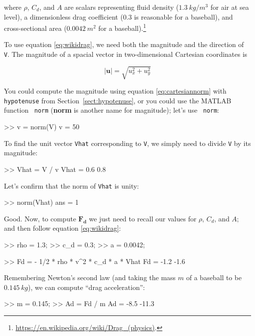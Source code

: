 \documentclass[
]{book}
\numberwithin{Answer}{chapter}
\numberwithin{Exercise}{chapter}
\renewcommand{\vec}[1]{\bm{\mathbf{#1}}}
\newcommand{\norm}[1]{\lvert #1 \rvert}
\begin{document}
where $\rho$, $C_d$, and $A$ are scalars representing fluid density
($1.3 ~ kg/m^3$ for air at sea level), a dimensionless drag coefficient
($0.3$ is reasonable for a baseball), and cross-sectional area ($0.0042
~ m^2$ for a baseball).\footnote{
    \url{https://en.wikipedia.org/wiki/Drag_(physics)}.}

To use equation \eqref{eq:wikidrag}, we need both the magnitude and the
direction of {\tt V}. The magnitude of a spacial vector \vec{u} in
two-dimensional Cartesian coordinates is

\begin{equation}\label{eq:cartesiannorm}
    \norm{\vec{u}} = \sqrt{u_x^2 + u_y^2}
\end{equation}

You could compute the magnitude using equation
\eqref{eq:cartesiannorm} with {\tt hypotenuse} from
Section~\ref{sect:hypotenuse}, or you could use the MATLAB function {\tt
norm} ({\bf norm} is another name for magnitude); let's use {\tt
norm}:

\begin{code}
>> v = norm(V)
v = 50
\end{code}

To find the unit vector {\tt Vhat} corresponding to {\tt V}, we simply
need to divide {\tt V} by its magnitude:

\begin{code}
>> Vhat = V / v
Vhat =  0.6  0.8
\end{code}

Let's confirm that the norm of {\tt Vhat} is unity:

\begin{code}
>> norm(Vhat)
ans = 1
\end{code}

Good. Now, to compute $\vec{F_d}$ we just need to recall our values for
$\rho$, $C_d$, and $A$; and then follow equation \eqref{eq:wikidrag}:

\begin{code}
>> rho = 1.3;          %
>> c_d = 0.3;          %
>> a = 0.0042;         %

>> Fd = - 1/2 * rho * v^2 * c_d * a * Vhat  %
Fd =  -1.2  -1.6
\end{code}

Remembering Newton's second law (and taking the mass $m$ of a baseball to be
$0.145 ~ kg$), we can compute ``drag acceleration'':

\begin{code}
>> m = 0.145;          %
>> Ad = Fd / m         %
Ad =  -8.5  -11.3
\end{code}
\end{document}
